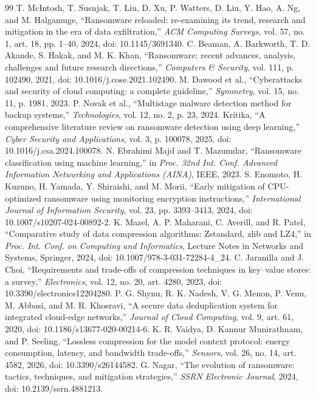 \documentclass{iaesarticle}
\begin{document}
\begin{thebibliography}{99}
 T. McIntosh, T. Susnjak, T. Liu, D. Xu, P. Watters, D. Liu, Y. Hao, A. Ng, and M. Halgamuge, ``Ransomware reloaded: re-examining its trend, research and mitigation in the era of data exfiltration,'' \textsl{ACM Computing Surveys}, vol. 57, no. 1, art. 18, pp. 1--40, 2024, doi: 10.1145/3691340.
 C. Beaman, A. Barkworth, T. D. Akande, S. Hakak, and M. K. Khan, ``Ransomware: recent advances, analysis, challenges and future research directions,'' \textsl{Computers \& Security}, vol. 111, p. 102490, 2021, doi: 10.1016/j.cose.2021.102490.
 M. Dawood et al., ``Cyberattacks and security of cloud computing: a complete guideline,'' \textsl{Symmetry}, vol. 15, no. 11, p. 1981, 2023.
 P. Novak et al., ``Multistage malware detection method for backup systems,'' \textsl{Technologies}, vol. 12, no. 2, p. 23, 2024.
 Kritika, ``A comprehensive literature review on ransomware detection using deep learning,'' \textsl{Cyber Security and Applications}, vol. 3, p. 100078, 2025, doi: 10.1016/j.csa.2024.100078.
 N. Ebrahimi Majd and T. Mazumdar, ``Ransomware classification using machine learning,'' in \textsl{Proc. 32nd Int. Conf. Advanced Information Networking and Applications (AINA)}, IEEE, 2023.
 S. Enomoto, H. Kuzuno, H. Yamada, Y. Shiraishi, and M. Morii, ``Early mitigation of CPU-optimized ransomware using monitoring encryption instructions,'' \textsl{International Journal of Information Security}, vol. 23, pp. 3393--3413, 2024, doi: 10.1007/s10207-024-00892-2.
 K. Mazel, A. P. Maharani, C. Averill, and R. Patel, ``Comparative study of data compression algorithms: Zstandard, zlib and LZ4,'' in \textsl{Proc. Int. Conf. on Computing and Informatics}, Lecture Notes in Networks and Systems, Springer, 2024, doi: 10.1007/978-3-031-72284-4\_24.
 C. Jaranilla and J. Choi, ``Requirements and trade-offs of compression techniques in key--value stores: a survey,'' \textsl{Electronics}, vol. 12, no. 20, art. 4280, 2023, doi: 10.3390/electronics12204280.
 P. G. Shynu, R. K. Nadesh, V. G. Menon, P. Venu, M. Abbasi, and M. R. Khosravi, ``A secure data deduplication system for integrated cloud-edge networks,'' \textsl{Journal of Cloud Computing}, vol. 9, art. 61, 2020, doi: 10.1186/s13677-020-00214-6.
 K. R. Vaidya, D. Kannur Munirathnam, and P. Seeling, ``Lossless compression for the model context protocol: energy consumption, latency, and bandwidth trade-offs,'' \textsl{Sensors}, vol. 26, no. 14, art. 4582, 2026, doi: 10.3390/s26144582.
 G. Nagar, ``The evolution of ransomware: tactics, techniques, and mitigation strategies,'' \textsl{SSRN Electronic Journal}, 2024, doi: 10.2139/ssrn.4881213.

\end{thebibliography}
\end{document}
